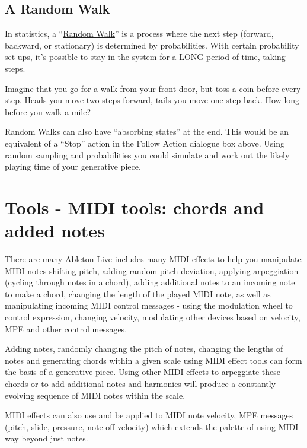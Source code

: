 \documentclass[
  12pt,
  letterpaper,
  oneside,
  open=any]{scrbook}
\begin{document}
\section{A Random Walk}\label{a-random-walk}

In statistics, a
``\href{https://en.wikipedia.org/wiki/Random_walk}{Random Walk}'' is a
process where the next step (forward, backward, or stationary) is
determined by probabilities. With certain probability set ups, it's
possible to stay in the system for a LONG period of time, taking steps.

Imagine that you go for a walk from your front door, but toss a coin
before every step. Heads you move two steps forward, tails you move one
step back. How long before you walk a mile?

Random Walks can also have ``absorbing states'' at the end. This would
be an equivalent of a ``Stop'' action in the Follow Action dialogue box
above. Using random sampling and probabilities you could simulate and
work out the likely playing time of your generative piece.


\chapter{Tools - MIDI tools: chords and added
notes}\label{Chapter-004-Tools-MIDI_tools}

There are many Ableton Live includes many
\href{https://www.ableton.com/en/live-manual/11/live-midi-effect-reference/\#live-midi-effect-reference}{MIDI
effects} to help you manipulate MIDI notes shifting pitch, adding random
pitch deviation, applying arpeggiation (cycling through notes in a
chord), adding additional notes to an incoming note to make a chord,
changing the length of the played MIDI note, as well as manipulating
incoming MIDI control messages - using the modulation wheel to control
expression, changing velocity, modulating other devices based on
velocity, MPE and other control messages.

\begin{tcolorbox}[enhanced jigsaw, breakable, left=2mm, leftrule=.75mm, toprule=.15mm, opacitybacktitle=0.6, toptitle=1mm, coltitle=black, colback=white, colbacktitle=quarto-callout-tip-color!10!white, opacityback=0, rightrule=.15mm, bottomrule=.15mm, titlerule=0mm, title=\textcolor{quarto-callout-tip-color}{\faLightbulb}\hspace{0.5em}{Key idea}, arc=.35mm, bottomtitle=1mm, colframe=quarto-callout-tip-color-frame]

Adding notes, randomly changing the pitch of notes, changing the lengths
of notes and generating chords within a given scale using MIDI effect
tools can form the basis of a generative piece. Using other MIDI effects
to arpeggiate these chords or to add additional notes and harmonies will
produce a constantly evolving sequence of MIDI notes within the scale.

MIDI effects can also use and be applied to MIDI note velocity, MPE
messages (pitch, slide, pressure, note off velocity) which extends the
palette of using MIDI way beyond just notes.

\end{tcolorbox}
\end{document}
